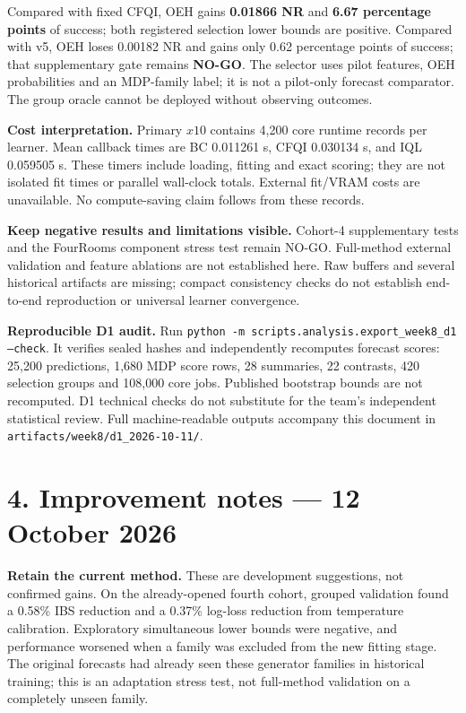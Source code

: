 \documentclass[10pt,a4paper]{article}
\begin{document}
Compared with fixed CFQI, OEH gains \textbf{0.01866 NR} and \textbf{6.67 percentage points} of success; both registered selection lower bounds are positive. Compared with v5, OEH loses 0.00182 NR and gains only 0.62 percentage points of success; that supplementary gate remains \textbf{NO-GO}. The selector uses pilot features, OEH probabilities and an MDP-family label; it is not a pilot-only forecast comparator. The group oracle cannot be deployed without observing outcomes.

\textbf{Cost interpretation.} Primary $x10$ contains 4,200 core runtime records per learner. Mean callback times are BC 0.011261 s, CFQI 0.030134 s, and IQL 0.059505 s. These timers include loading, fitting and exact scoring; they are not isolated fit times or parallel wall-clock totals. External fit/VRAM costs are unavailable. No compute-saving claim follows from these records.

\textbf{Keep negative results and limitations visible.} Cohort-4 supplementary tests and the FourRooms component stress test remain NO-GO. Full-method external validation and feature ablations are not established here. Raw buffers and several historical artifacts are missing; compact consistency checks do not establish end-to-end reproduction or universal learner convergence.

\textbf{Reproducible D1 audit.} Run \texttt{python -m scripts.analysis.export\_week8\_d1 --check}. It verifies sealed hashes and independently recomputes forecast scores: 25,200 predictions, 1,680 MDP score rows, 28 summaries, 22 contrasts, 420 selection groups and 108,000 core jobs. Published bootstrap bounds are not recomputed. D1 technical checks do not substitute for the team's independent statistical review. Full machine-readable outputs accompany this document in \texttt{artifacts/week8/d1\_2026-10-11/}.

\newpage
\section*{4. Improvement notes --- 12 October 2026}
\textbf{Retain the current method.} These are development suggestions, not confirmed gains. On the already-opened fourth cohort, grouped validation found a 0.58\% IBS reduction and a 0.37\% log-loss reduction from temperature calibration. Exploratory simultaneous lower bounds were negative, and performance worsened when a family was excluded from the new fitting stage. The original forecasts had already seen these generator families in historical training; this is an adaptation stress test, not full-method validation on a completely unseen family.
\end{document}
